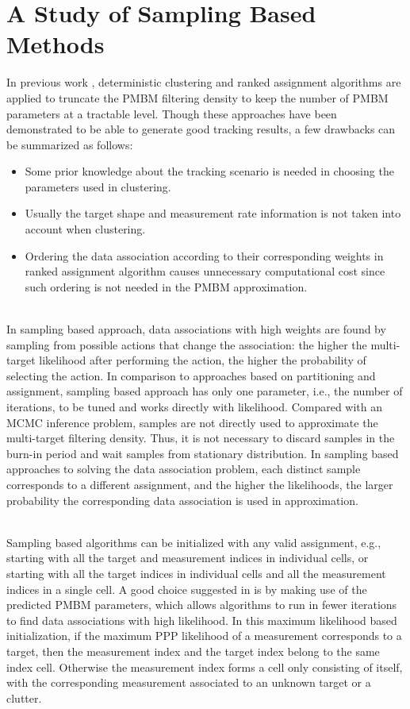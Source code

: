 \chapter{A Study of Sampling Based Methods}
In previous work \cite{pmbmextended,pmbmextended2}, deterministic clustering and ranked assignment algorithms are applied to truncate the PMBM filtering density to keep the number of PMBM parameters at a tractable level. Though these approaches have been demonstrated to be able to generate good tracking results, a few drawbacks can be summarized as follows:
\begin{itemize}
    \item Some prior knowledge about the tracking scenario is needed in choosing the parameters used in clustering. 
    \item Usually the target shape and measurement rate information is not taken into account when clustering. 
    \item Ordering the data association according to their corresponding weights in ranked assignment algorithm causes unnecessary computational cost since such ordering is not needed in the PMBM approximation. 
\end{itemize}

~\\
In sampling based approach, data associations with high weights are found by sampling from possible actions that change the association: the higher the multi-target likelihood after performing the action, the higher the probability of selecting the action. In comparison to approaches based on partitioning and assignment, sampling based approach has only one parameter, i.e., the number of iterations, to be tuned and works directly with likelihood. Compared with an MCMC inference problem, samples are not directly used to approximate the multi-target filtering density. Thus, it is not necessary to discard samples in the burn-in period and wait samples from stationary distribution. In sampling based approaches to solving the data association problem, each distinct sample corresponds to a different assignment, and the higher the likelihoods, the larger probability the corresponding data association is used in approximation. 

~\\
Sampling based algorithms can be initialized with any valid assignment, e.g., starting with all the target and measurement indices in individual cells, or starting with all the target indices in individual cells and all the measurement indices in a single cell. A good choice suggested in \cite{soextended} is by making use of the predicted PMBM parameters, which allows algorithms to run in fewer iterations to find data associations with high likelihood. In this maximum likelihood based initialization, if the maximum PPP likelihood of a measurement corresponds to a target, then the measurement index and the target index belong to the same index cell. Otherwise the measurement index forms a cell only consisting of itself, with the corresponding measurement associated to an unknown target or a clutter.

